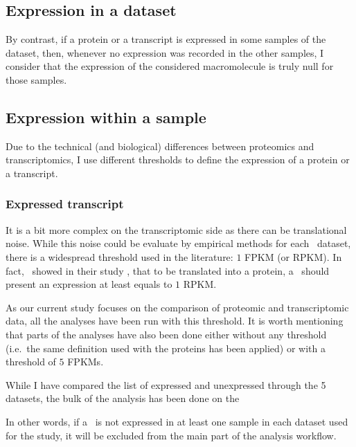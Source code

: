   \subsection{Expression in a dataset}
  \label{subsec:IntegrationExpressedOrNot--expDataset}
  By contrast, if a protein or a transcript is expressed in some samples of the
  dataset, then, whenever no expression was recorded in the other
  samples, I consider that the expression of the considered macromolecule is truly
  null for those samples.

  \subsection{Expression within a sample}
  Due to the technical (and biological) differences between proteomics and
  transcriptomics, I use different thresholds to define the expression of a protein
  or a transcript.

  \subsubsection{Expressed transcript}\label{subsubsec:exprTrans}
  It is a bit more complex on the transcriptomic side as there can be
  translational noise. While this noise could be evaluate by empirical methods for
  each \Rnaseq\ dataset, there is a widespread threshold used in the literature:
  $1$ \gls{FPKM} (or \gls{RPKM}). In fact,~\citet{Hebenstreit:2011} showed in
  their study , that to be translated into a protein, a \mRNA\ should
  present an expression at least equals to $1$ \gls{RPKM}.

  As our current study focuses on the comparison of proteomic and transcriptomic
  data, all the analyses have been run with this threshold. It is worth mentioning
  that parts of the analyses have also been done either without
  any threshold (i.e.\ the same definition used with the proteins has been applied)
  or with a threshold of $5$ \glspl{FPKM}.

  While I have compared the list of expressed and unexpressed \mRNAs through
  the 5 datasets, the bulk of the analysis has been done on the 

  In other words, if a \mRNA\ is not expressed in at least one sample in each
  dataset used for the study, it will be excluded from the main part of the
  analysis workflow.






